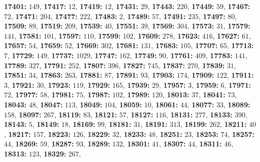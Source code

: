 \textsf{\bfseries 17401:} $149$, \textsf{\bfseries 17417:} $12$, \textsf{\bfseries 17419:} $12$, \textsf{\bfseries 17431:} $29$, \textsf{\bfseries 17443:} $220$, \textsf{\bfseries 17449:} $59$, \textsf{\bfseries 17467:} $72$, \textsf{\bfseries 17471:} $204$, \textsf{\bfseries 17477:} $222$, \textsf{\bfseries 17483:} $2$, \textsf{\bfseries 17489:} $57$, \textsf{\bfseries 17491:} $235$, \textsf{\bfseries 17497:} $80$, \textsf{\bfseries 17509:} $89$, \textsf{\bfseries 17519:} $209$, \textsf{\bfseries 17539:} $40$, \textsf{\bfseries 17551:} $39$, \textsf{\bfseries 17569:} $304$, \textsf{\bfseries 17573:} $31$, \textsf{\bfseries 17579:} $141$, \textsf{\bfseries 17581:} $101$, \textsf{\bfseries 17597:} $110$, \textsf{\bfseries 17599:} $102$, \textsf{\bfseries 17609:} $278$, \textsf{\bfseries 17623:} $416$, \textsf{\bfseries 17627:} $61$, \textsf{\bfseries 17657:} $54$, \textsf{\bfseries 17659:} $52$, \textsf{\bfseries 17669:} $302$, \textsf{\bfseries 17681:} $131$, \textsf{\bfseries 17683:} $105$, \textsf{\bfseries 17707:} $65$, \textsf{\bfseries 17713:} $7$, \textsf{\bfseries 17729:} $149$, \textsf{\bfseries 17737:} $1029$, \textsf{\bfseries 17747:} $162$, \textsf{\bfseries 17749:} $90$, \textsf{\bfseries 17761:} $409$, \textsf{\bfseries 17783:} $141$, \textsf{\bfseries 17789:} $327$, \textsf{\bfseries 17791:} $252$, \textsf{\bfseries 17807:} $396$, \textsf{\bfseries 17827:} $745$, \textsf{\bfseries 17837:} $270$, \textsf{\bfseries 17839:} $31$, \textsf{\bfseries 17851:} $34$, \textsf{\bfseries 17863:} $263$, \textsf{\bfseries 17881:} $87$, \textsf{\bfseries 17891:} $93$, \textsf{\bfseries 17903:} $174$, \textsf{\bfseries 17909:} $122$, \textsf{\bfseries 17911:} $3$, \textsf{\bfseries 17921:} $30$, \textsf{\bfseries 17923:} $119$, \textsf{\bfseries 17929:} $165$, \textsf{\bfseries 17939:} $29$, \textsf{\bfseries 17957:} $3$, \textsf{\bfseries 17959:} $6$, \textsf{\bfseries 17971:} $72$, \textsf{\bfseries 17977:} $58$, \textsf{\bfseries 17981:} $75$, \textsf{\bfseries 17987:} $102$, \textsf{\bfseries 17989:} $120$, \textsf{\bfseries 18013:} $37$, \textsf{\bfseries 18041:} $73$, \textsf{\bfseries 18043:} $48$, \textsf{\bfseries 18047:} $113$, \textsf{\bfseries 18049:} $104$, \textsf{\bfseries 18059:} $10$, \textsf{\bfseries 18061:} $44$, \textsf{\bfseries 18077:} $33$, \textsf{\bfseries 18089:} $158$, \textsf{\bfseries 18097:} $267$, \textsf{\bfseries 18119:} $83$, \textsf{\bfseries 18121:} $57$, \textsf{\bfseries 18127:} $116$, \textsf{\bfseries 18131:} $277$, \textsf{\bfseries 18133:} $390$, \textsf{\bfseries 18143:} $5$, \textsf{\bfseries 18149:} $18$, \textsf{\bfseries 18169:} $99$, \textsf{\bfseries 18181:} $31$, \textsf{\bfseries 18191:} $313$, \textsf{\bfseries 18199:} $262$, \textsf{\bfseries 18211:} $40$, \textsf{\bfseries 18217:} $157$, \textsf{\bfseries 18223:} $126$, \textsf{\bfseries 18229:} $32$, \textsf{\bfseries 18233:} $48$, \textsf{\bfseries 18251:} $23$, \textsf{\bfseries 18253:} $74$, \textsf{\bfseries 18257:} $44$, \textsf{\bfseries 18269:} $59$, \textsf{\bfseries 18287:} $93$, \textsf{\bfseries 18289:} $132$, \textsf{\bfseries 18301:} $41$, \textsf{\bfseries 18307:} $44$, \textsf{\bfseries 18311:} $46$, \textsf{\bfseries 18313:} $123$, \textsf{\bfseries 18329:} $267$, 
